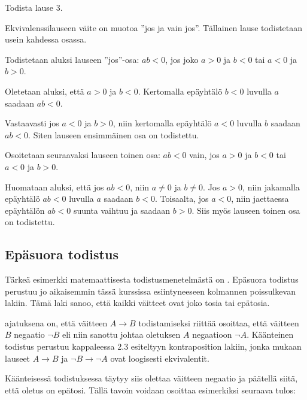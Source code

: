 
\begin{esimerkki}
	Todista lause 3.
	
	\begin{todistus}
		Ekvivalenssilauseen väite on muotoa ''jos ja vain jos''. Tällainen lause todistetaan usein kahdessa osassa.

		Todistetaan aluksi lauseen ''jos''-osa: $ab<0$, jos joko $a>0$ ja $b<0$ tai $a<0$ ja $b>0$.

		Oletetaan aluksi, että $a>0$ ja $b<0$. Kertomalla epäyhtälö $b<0$ luvulla $a$ saadaan $ab<0$.

		Vastaavasti jos $a<0$ ja $b>0$, niin kertomalla epäyhtälö $a<0$ luvulla $b$ saadaan $ab<0$. Siten lauseen 
		ensimmäinen osa on todistettu.

		Osoitetaan seuraavaksi lauseen toinen osa: $ab<0$ vain, jos $a>0$ ja $b<0$ tai $a<0$ ja $b>0$.

		Huomataan aluksi, että jos $ab<0$, niin $a\neq 0$ ja $b\neq 0$. Jos $a>0$, niin jakamalla epäyhtälö $ab<0$ 
		luvulla $a$ saadaan $b<0$. Toisaalta, jos $a<0$, niin jaettaessa epäyhtälön $ab<0$ suunta vaihtuu ja saadaan 
		$b>0$. Siis myös lauseen toinen osa on todistettu.
	\end{todistus}
\end{esimerkki}

\subsection*{Epäsuora todistus} %

Tärkeä esimerkki matemaattisesta todistusmenetelmästä on .
Epäsuora todistus perustuu jo aikaisemmin tässä kurssissa esiintyneeseen kolmannen poissulkevan lakiin.
Tämä laki sanoo, että kaikki väitteet ovat joko tosia tai epätosia.

 ajatuksena on, että väitteen $A\to B$
todistamiseksi riittää osoittaa, että väitteen $B$ negaatio $\lnot B$ eli niin sanottu
 johtaa oletuksen $A$ negaatioon $\lnot A$.
Käänteinen todistus perustuu kappaleessa 2.3 esiteltyyn kontraposition lakiin,
jonka mukaan lauseet $A\to B$ ja $\lnot B \to \lnot A$ ovat loogisesti ekvivalentit.

Käänteisessä todistuksessa täytyy siis olettaa väitteen negaatio ja päätellä siitä,
että oletus on epätosi. Tällä tavoin voidaan osoittaa esimerkiksi seuraava tulos:

